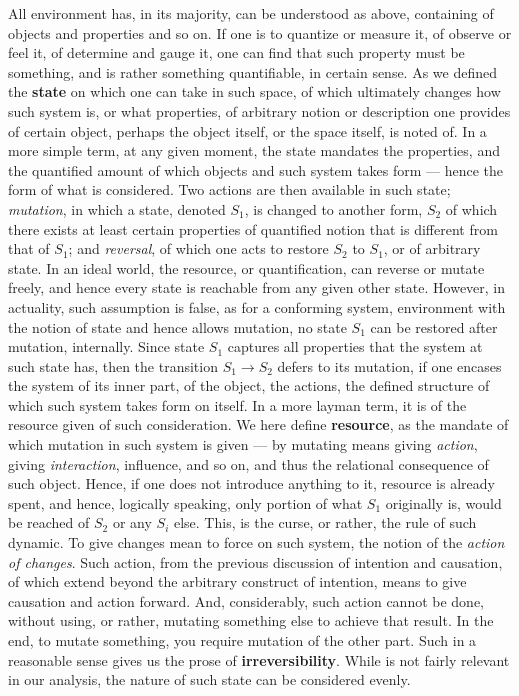 All environment has, in its majority, can be understood as above, containing of objects and properties and so on. If one is to quantize or measure it, of observe or feel it, of determine and gauge it, one can find that such property must be something, and is rather something quantifiable, in certain sense. As  we defined the \textbf{state} on which one can take in such space, of which ultimately changes how such system is, or what properties, of arbitrary notion or description one provides of certain object, perhaps the object itself, or the space itself, is noted of. In a more simple term, at any given moment, the state mandates the properties, and the quantified amount of which objects and such system takes form --- hence the form of what is considered. Two actions are then available in such state; \textit{mutation}, in which a state, denoted $S_{1}$, is changed to another form, $S_{2}$ of which there exists at least certain properties of quantified notion that is different from that of $S_{1}$; and \textit{reversal}, of which one acts to restore $S_{2}$ to $S_{1}$, or of arbitrary state. In an ideal world, the resource, or quantification, can reverse or mutate freely, and hence every state is reachable from any given other state. However, in actuality, such assumption is false, as for a conforming system, environment with the notion of state and hence allows mutation, no state $S_{1}$ can be restored after mutation, internally. Since state $S_{1}$ captures all properties that the system at such state has, then the transition $S_{1}\to S_{2}$ defers to its mutation, if one encases the system of its inner part, of the object, the actions, the defined structure of which such system takes form on itself. In a more layman term, it is of the resource given of such consideration. We here define \textbf{resource}, as the mandate of which mutation in such system is given --- by mutating means giving \textit{action}, giving \textit{interaction}, influence, and so on, and thus the relational consequence of such object. Hence, if one does not introduce anything to it, resource is already spent, and hence, logically speaking, only portion of what $S_{1}$ originally is, would be reached of $S_{2}$ or any $S_{i}$ else. This, is the curse, or rather, the rule of such dynamic. To give changes mean to force on such system, the notion of the \textit{action of changes}. Such action, from the previous discussion of intention and causation, of which extend beyond the arbitrary construct of intention, means to give causation and action forward. And, considerably, such action cannot be done, without using, or rather, mutating something else to achieve that result. In the end, to mutate something, you require mutation of the other part. Such in a reasonable sense gives us the prose of \textbf{irreversibility}. While is not fairly relevant in our analysis, the nature of such state can be considered evenly. 

